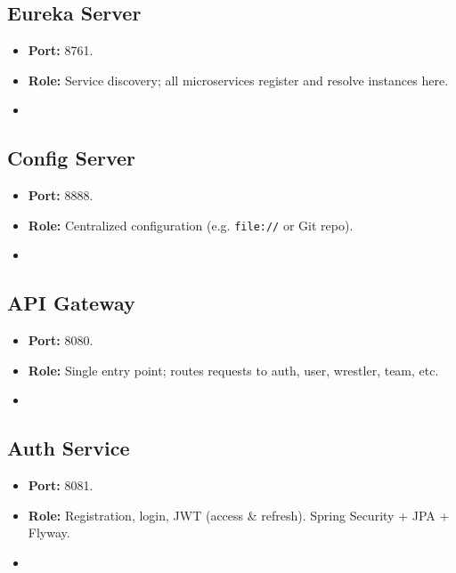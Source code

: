 \documentclass[11pt,a4paper]{article}
\begin{document}
\subsection{Eureka Server}
\begin{itemize}
\item \textbf{Port:} 8761.
\item \textbf{Role:} Service discovery; all microservices register and resolve instances here.
\item %
\end{itemize}

\subsection{Config Server}
\begin{itemize}
\item \textbf{Port:} 8888.
\item \textbf{Role:} Centralized configuration (e.g. \texttt{file://} or Git repo).
\item %
\end{itemize}

\subsection{API Gateway}
\begin{itemize}
\item \textbf{Port:} 8080.
\item \textbf{Role:} Single entry point; routes requests to auth, user, wrestler, team, etc.
\item %
\end{itemize}

\subsection{Auth Service}
\begin{itemize}
\item \textbf{Port:} 8081.
\item \textbf{Role:} Registration, login, JWT (access \& refresh). Spring Security + JPA + Flyway.
\item %
\end{itemize}
\end{document}
